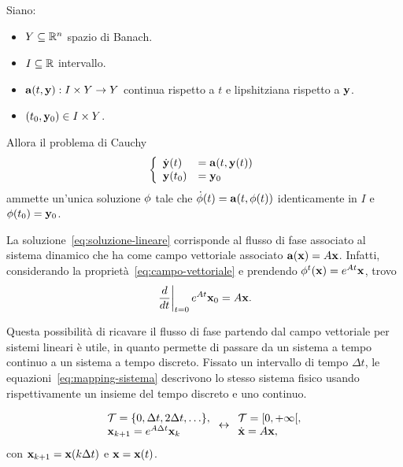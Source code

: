 \begin{thm}
    Siano:
    \begin{itemize}
        \item $Y \subseteq \mathbb{R}^n$ spazio di Banach.%
        \item $I \subseteq \mathbb{R}$ intervallo.%
        \item $\mathbf{a}(t, \mathbf{y}) : I \times Y \to Y$ continua rispetto a $t$ e lipshitziana rispetto a $\mathbf{y}$.%
        \item $(t_0, \mathbf{y}_0) \in I \times Y$.
    \end{itemize}
    Allora il problema di Cauchy
    \begin{equation*}
        \left\{
            \begin{array}{ll}
                \dot{\mathbf{y}}(t) &= \mathbf{a}(t, \mathbf{y} (t)) \\
                \mathbf{y} (t_0) &= \mathbf{y}_0
            \end{array}
        \right.
    \end{equation*}
    ammette un'unica soluzione $\mathbf{\phi}$ tale che $\dot {\mathbf{\phi}}(t) = \mathbf{a}(t, \mathbf{\phi}(t))$
    identicamente in $I$ e $\mathbf{\phi}(t_0) = \mathbf{y}_0$.
    \label{thm:esistenza-unicità}
\end{thm}

La soluzione~\eqref{eq:soluzione-lineare}
corrisponde al flusso di fase associato al sistema dinamico che ha come campo vettoriale
associato $\mathbf{a}(\mathbf{x}) = A\mathbf{x}$.
Infatti, considerando la proprietà~\eqref{eq:campo-vettoriale} e prendendo
$\phi^t(\mathbf{x}) = e^{At} \mathbf{x}$, trovo
\begin{equation*}
        \left. \frac d{dt} \right|_{t=0} e^{At} \mathbf{x}_0 = A \mathbf{x}.
\end{equation*}

Questa possibilità di ricavare il flusso di fase partendo dal campo vettoriale per
sistemi lineari è utile, in quanto permette di passare da un sistema a tempo continuo
a un sistema a tempo discreto.
Fissato un intervallo di tempo $\Delta t$, le equazioni~\eqref{eq:mapping-sistema} descrivono lo stesso sistema fisico usando
rispettivamente un insieme del tempo discreto e uno continuo.

\begin{equation}
    \begin{array}{l}
        \mathcal T = \{0, \Delta t, 2\Delta t, \ldots\}, \\
        \mathbf{x}_{k+1} = e^{A \Delta t} \mathbf{x}_k
    \end{array}
        \leftrightarrow
    \begin{array}{l}
        \mathcal T = [0, +\infty [, \\
        \dot{\mathbf{x}} = A \mathbf{x},
    \end{array}
    \label{eq:mapping-sistema}
\end{equation}
con $\mathbf{x}_{k+1} = \mathbf{x}(k\Delta t)$ e $\mathbf{x} = \mathbf{x}(t)$.

